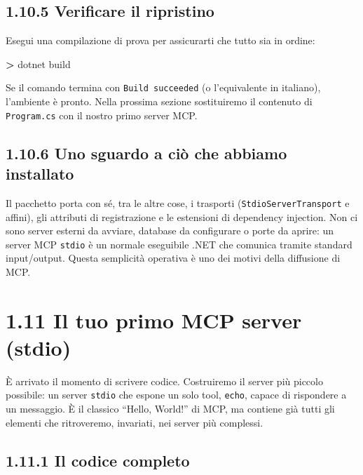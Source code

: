 \documentclass[
  italian,
  10pt,
]{book}
\newenvironment{Shaded}{\begin{snugshade}}{\end{snugshade}}
\newcommand{\ExtensionTok}[1]{#1}
\newcommand{\NormalTok}[1]{#1}
\newcommand{\OperatorTok}[1]{\textcolor[rgb]{0.81,0.36,0.00}{\textbf{#1}}}
\begin{document}
\subsection{1.10.5 Verificare il
ripristino}\label{verificare-il-ripristino}

Esegui una compilazione di prova per assicurarti che tutto sia in
ordine:

\begin{Shaded}
\begin{Highlighting}[]
\OperatorTok{\textgreater{}}\NormalTok{ dotnet }\ExtensionTok{build}
\end{Highlighting}
\end{Shaded}

Se il comando termina con \texttt{Build\ succeeded} (o l'equivalente in
italiano), l'ambiente è pronto. Nella prossima sezione sostituiremo il
contenuto di \texttt{Program.cs} con il nostro primo server MCP.

\subsection{1.10.6 Uno sguardo a ciò che abbiamo
installato}\label{uno-sguardo-a-ciuxf2-che-abbiamo-installato}

Il pacchetto porta con sé, tra le altre cose, i trasporti
(\texttt{StdioServerTransport} e affini), gli attributi di registrazione
e le estensioni di dependency injection. Non ci sono server esterni da
avviare, database da configurare o porte da aprire: un server MCP
\texttt{stdio} è un normale eseguibile .NET che comunica tramite
standard input/output. Questa semplicità operativa è uno dei motivi
della diffusione di MCP.

\section{1.11 Il tuo primo MCP server
(stdio)}\label{il-tuo-primo-mcp-server-stdio}

È arrivato il momento di scrivere codice. Costruiremo il server più
piccolo possibile: un server \texttt{stdio} che espone un solo tool,
\texttt{echo}, capace di rispondere a un messaggio. È il classico
``Hello, World!'' di MCP, ma contiene già tutti gli elementi che
ritroveremo, invariati, nei server più complessi.

\subsection{1.11.1 Il codice completo}\label{il-codice-completo}
\end{document}

